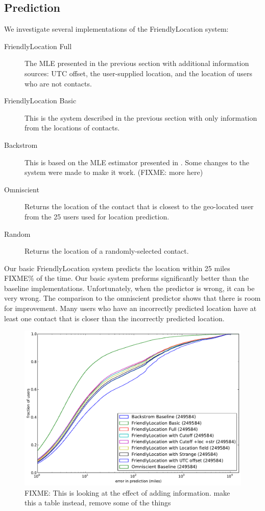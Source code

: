 \subsection{Prediction}
We investigate several implementations of the FriendlyLocation system:
\begin{description}
\item[FriendlyLocation Full] The MLE presented in the previous section with
    additional information sources: UTC offset, the user-supplied location,
    and the location of users who are not contacts.
\item[FriendlyLocation Basic] This is the system described in the previous
    section with only information from the locations of contacts.
\item[Backstrom] This is based on the MLE estimator presented in
    \cite{backstro m2010find}. Some changes to the system were made to make it
    work. (FIXME: more here)
\item[Omniscient] Returns the location of the contact that is closest to the
    geo-located user from the 25 users used for location prediction.
\item[Random] Returns the location of a randomly-selected contact.
\end{description}

Our basic FriendlyLocation system predicts the location within 25 miles FIXME\% of
the time.
%
Our basic system preforms significantly better than the baseline implementations.
%
Unfortunately, when the predictor is wrong, it can be very wrong.
%
The comparison to the omniscient predictor shows that there is room for improvement.
%
Many users who have an incorrectly predicted location have at least one contact
that is closer than the incorrectly predicted location.


\begin{figure}[tb]
\centering
\includegraphics[width=\linewidth]{figures/fl_parts.pdf}
\caption{
    FIXME: This is looking at the effect of adding information. make this a table instead, remove some of the things
}
\label{fig:NearProbFit}
\end{figure}

